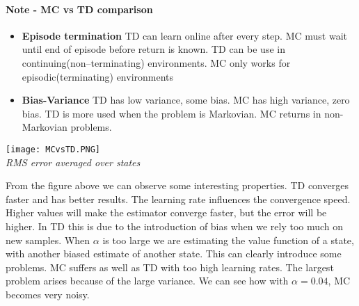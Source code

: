 \documentclass[main.tex]{subfiles}
\begin{document}
\paragraph{Note - MC vs TD comparison}
\begin{itemize}
    \item \textbf{Episode termination} TD can learn online after every step. MC must wait until end of episode before return is known. TD can be use in continuing(non–terminating) environments. MC only works for episodic(terminating) environments
    \item \textbf{Bias-Variance} TD has low variance, some bias. MC has high variance, zero bias. TD is more used when the problem is Markovian. MC returns in non-Markovian problems.
\end{itemize}
\begin{center}
    \texttt{[image: MCvsTD.PNG]} \\
    \textit{RMS error averaged over states}
\end{center}
From the figure above we can observe some interesting properties. TD converges faster and has better results. The learning rate influences the convergence speed. Higher values will make the estimator converge faster, but the error will be higher. In TD this is due to the introduction of bias when we rely too much on new samples. When $\alpha$ is too large we are estimating the value function of a state, with another biased estimate of another state. This can clearly introduce some problems. MC suffers as well as TD with too high learning rates. The largest problem arises because of the large variance. We can see how with $\alpha=0.04$, MC becomes very noisy.
\end{document}

